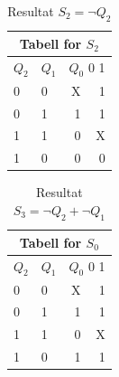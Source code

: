 \documentclass[12pt,norsk,a4paper]{article}
\begin{document}
    \begin{table}[H]
    \begin{center}
    \begin{tabular}{|l|l|r|r|} \hline
    \multicolumn{4}{|c|}{Tabell for $S_2$} \\ \hline
    $Q_2$ & $Q_1$ & \multicolumn{2}{|r|}{$Q_0$ \hspace{20 mm} 0 \hspace{2 mm} 1} \\ \hline
    0 & 0 & \hspace{27 mm} X \cellcolor[gray]{0.8} & \cellcolor[gray]{0.8} 1 \\ \hline 
    0 & 1 & 1 \cellcolor[gray]{0.8} & 1 \cellcolor[gray]{0.8} \\ \hline
    1 & 1 & 0 & X \\ \hline
    1 & 0 & 0 & 0 \\ \hline
    \end{tabular}
    \end{center}
    \caption{Resultat $S_2=\neg Q_2$}
    \end{table}

    \begin{table}[H]
    \begin{center}
    \begin{tabular}{|l|l|r|r|} \hline
    \multicolumn{4}{|c|}{Tabell for $S_0$} \\ \hline
    $Q_2$ & $Q_1$ & \multicolumn{2}{|r|}{$Q_0$ \hspace{20 mm} 0 \hspace{2 mm} 1} \\ \hline
    0 & 0 & \hspace{27 mm} X \cellcolor[gray]{0.8} & \cellcolor[gray]{0.8} 1 \\ \hline 
    0 & 1 & 1 \cellcolor[gray]{0.8} & 1 \cellcolor[gray]{0.8} \\ \hline
    1 & 1 & 0 & X \\ \hline
    1 & 0 & 1 \cellcolor[gray]{0.8} & 1 \cellcolor[gray]{0.8} \\ \hline
    \end{tabular}
    \end{center}
    \caption{Resultat $S_3=\neg Q_2 + \neg Q_1$}
    \end{table}
\clearpage
\end{document}
